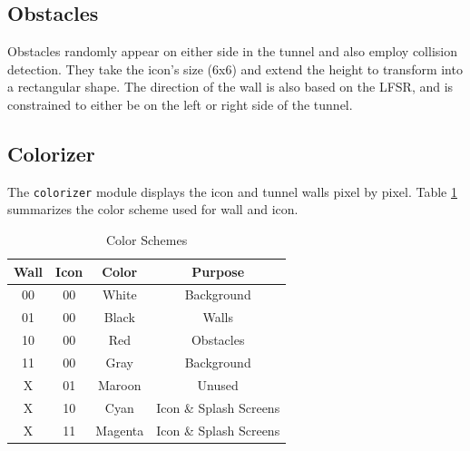 \documentclass[11pt]{article}
\begin{document}
 
\subsection{Obstacles}
	Obstacles randomly appear on either side in the tunnel and also employ collision detection.  They take the icon's size (6x6) and extend the height to transform into a rectangular shape. The direction of the wall is also based on the LFSR, and is constrained to either be on the left or right side of the tunnel.
		
\subsection{Colorizer}

The \texttt{colorizer} module displays the icon and tunnel walls pixel by pixel.  Table \ref{colorizer} summarizes the color scheme used for wall and icon.
 
	\begin {table}
	\begin {center} 
	\vspace{15pt}
	
	\begin{tabular}{||c|c|c|c||}\hline	
		\textbf{Wall}	&	\textbf{Icon}	&	\textbf{Color}	&	\textbf{Purpose}		\\\hline
		00		&	00		&	White 	&	Background 	\\\hline
		01		&	00		&	Black 	&	Walls 		\\\hline
		10		&	00		&	Red 	&	Obstacles 	\\\hline
		11		&	00		&	Gray 	&	Background	\\\hline
		X		&	01		&	Maroon	&	Unused		\\\hline
		X		&	10		&	Cyan	&	Icon \& Splash Screens	\\\hline
		X		&	11		&	Magenta	&	Icon \& Splash Screens	\\\hline	
	\end{tabular}
		\caption {Color Schemes} \label{colorizer}
	\end{center}
	\end{table} 		


%
\end{document}
